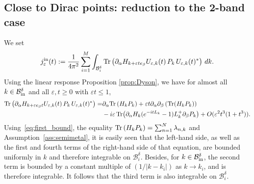 \documentclass[a4paper,11pt]{article}
\theoremstyle{plain}
\theoremstyle{remark}
\def\eps{{\varepsilon}}
\begin{document}
\subsection{Close to Dirac points: reduction to the 2-band case}
\label{sec:dirac_reduc}


We set
\begin{equation} \label{eq:jepsin}
j_\eps^{\rm in}(t):= \frac1{4\pi^2} \sum_{i=1}^M \int_{\mathcal B^\delta_i}{\rm Tr} \left(\partial_\alpha H_{k+\eps te_\beta}U_{\eps,k}(t)\, P_k\, U_{\eps,k}(t)^*\right) \, dk.
\end{equation}
Using the linear response Proposition \ref{prop:Dyson}, we have for almost all  $k\in \mathcal B^\delta_{\rm in}$ and all $\eps,t \ge 0$ with $\eps t\le1$,
\begin{align*}
  {\rm Tr} \left(\partial_\alpha H_{k+\eps e_\beta t}U_{\eps,k}(t)\, P_k\, U_{\eps,k}(t)^*\right) =
  &\partial_\alpha {\rm Tr} \left(H_k P_k\right)
  + \eps t  { \partial_\alpha\partial_\beta} \left( \Tr (H_k P_k) \right)\\
  & - i \eps \Tr(\partial_\alpha H_k (e^{-i t L_k} - 1) L_{k}^{+} \partial_\beta P_k) + O(\eps^{2} {t}^{3}(1+t^3)).
\end{align*}
Using~\eqref{eq:first_bound},  the equality
${\rm Tr} \left(H_k P_k\right) = \sum_{n=1}^{N}
\lambda_{n,k}$ and Assumption~\ref{ass:semimetal}, it is easily seen that the
left-hand side, as well as the first and fourth terms of the right-hand side of that equation,
are bounded uniformly in $k$ and therefore integrable on
$\mathcal B_{i}^{\delta}$. Besides, for $k\in\mathcal B^\delta_{\rm in}$, the second term is bounded by a constant
multiple of $(1/|k-k_{i}|)$ as $k \to k_{i}$, and is therefore
integrable. It follows that the third term is also integrable on
$\mathcal B_{i}^{\delta}$.

\medskip
\end{document}
